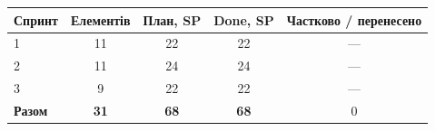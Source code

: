 \begin{tabular}{@{}lcccc@{}}
\toprule
Спринт & Елементів & План, SP & Done, SP & Частково / перенесено\\
\midrule
1 & 11 & 22 & 22 & —\\
2 & 11 & 24 & 24 & —\\
3 & 9 & 22 & 22 & —\\
\midrule
\textbf{Разом} & \textbf{31} & \textbf{68} & \textbf{68} & 0\\
\bottomrule
\end{tabular}
